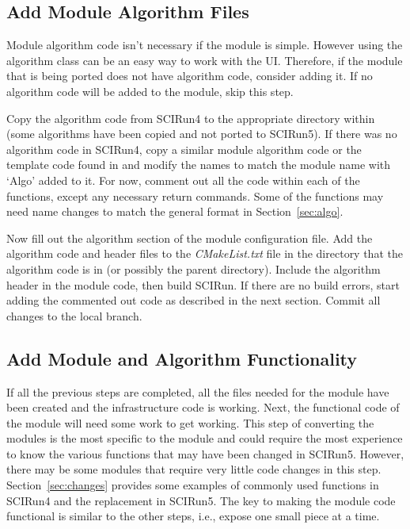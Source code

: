 \documentclass[fleqn,11pt,openany]{book}
\begin{document}
\subsection{Add Module Algorithm Files}

Module algorithm code isn't necessary if the module is simple.  
However using the algorithm class can be an easy way to work with the UI.
Therefore, if the module that is being ported does not have algorithm code, consider adding it.  
If no algorithm code will be added to the module, skip this step.  

Copy the algorithm code from SCIRun4 to the appropriate directory within \emph{} (some algorithms have been copied and not ported to SCIRun5).
If there was no algorithm code in SCIRun4, copy a similar module algorithm code or the template code found in \emph{} and modify the names to match the module name with `Algo' added to it.  
For now, comment out all the code within each of the functions, except any necessary return commands.  
Some of the functions may need name changes to match the general format in Section~\ref{sec:algo}.  

Now fill out the algorithm section of the module configuration file.  
Add the algorithm code and header files to the \emph{CMakeList.txt} file in the directory that the algorithm code is in (or possibly the parent directory).  
Include the algorithm header in the module code, then build SCIRun. 
If there are no build errors, start adding the commented out code as described in the next section.
Commit all changes to the local branch.

\subsection{Add Module and Algorithm Functionality}

If all the previous steps are completed, all the files needed for the module have been created and the infrastructure code is working.  
Next, the functional code of the module will need some work to get working.  
This step of converting the modules is the most specific to the module and could require the most experience to know the various functions that may have been changed in SCIRun5. 
However, there may be some modules that require very little code changes in this step.  
Section~\ref{sec:changes} provides some examples of commonly used functions in SCIRun4 and the replacement in SCIRun5.
The key to making the module code functional is similar to the other steps, i.e., expose one small piece at a time. 
\end{document}
